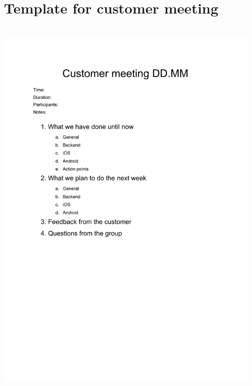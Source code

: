 \section{Template for customer meeting}
\label{app:customer-template}
\includegraphics[trim={0 6cm 2cm 0},clip,height=20cm]{appendices/meeting-template-customer.pdf}